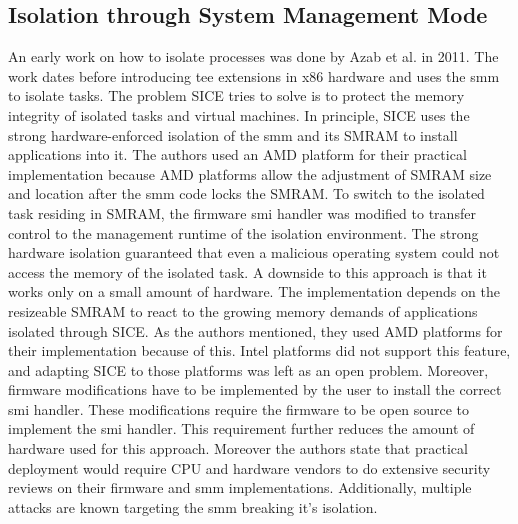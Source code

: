 \subsection{Isolation through System Management Mode}
\label{sec:20:isolation_smm}
An early work on how to isolate processes was done by Azab et al. in
2011.\cite{azab_sice_2011} The work dates before introducing \gls{tee}
extensions in x86 hardware and uses the \gls{smm} to isolate tasks. The problem
SICE tries to solve is to protect the memory integrity of isolated tasks and
virtual machines. In principle, SICE uses the strong hardware-enforced isolation
of the \gls{smm} and its SMRAM to install applications into it. The authors used
an AMD platform for their practical implementation because AMD platforms allow
the adjustment of SMRAM size and location after the \gls{smm} code locks the
SMRAM.\cite{bios2014amd} To switch to the isolated task residing in SMRAM, the
firmware \gls{smi} handler was modified to transfer control to the management
runtime of the isolation environment. The strong hardware isolation guaranteed
that even a malicious operating system could not access the memory of the
isolated task. A downside to this approach is that it works only on a small
amount of hardware. The implementation depends on the resizeable SMRAM to react
to the growing memory demands of applications isolated through SICE. As the
authors mentioned, they used AMD platforms for their implementation because of
this. Intel platforms did not support this feature, and adapting SICE to those
platforms was left as an open problem. Moreover, firmware modifications have to
be implemented by the user to install the correct \gls{smi} handler. These
modifications require the firmware to be open source to implement the \gls{smi}
handler. This requirement further reduces the amount of hardware used for this
approach. Moreover the authors state that practical deployment would require CPU
and hardware vendors to do extensive security reviews on their firmware and
\gls{smm} implementations. Additionally, multiple attacks are known targeting
the \gls{smm} breaking it's isolation.\cite{wojtczuk2014attacking,
    wojtczuk2009attacking, wojtczuk2009poisining}

